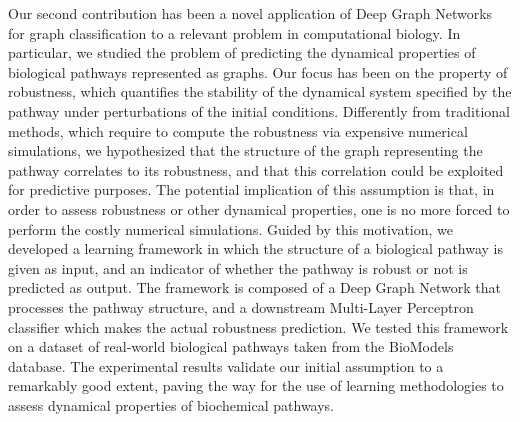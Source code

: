 Our second contribution has been a novel application of Deep Graph Networks for graph classification to a relevant problem in computational biology. In particular, we studied the problem of predicting the dynamical properties of biological pathways represented as graphs. Our focus has been on the property of robustness, which quantifies the stability of the dynamical system specified by the pathway under perturbations of the initial conditions. Differently from traditional methods, which require to compute the robustness via expensive numerical simulations, we hypothesized that the structure of the graph representing the pathway correlates to its robustness, and that this correlation could be exploited for predictive purposes. The potential implication of this assumption is that, in order to assess robustness or other dynamical properties, one is no more forced to perform the costly numerical simulations. Guided by this motivation, we developed a learning framework in which the structure of a biological pathway is given as input, and an indicator of whether the pathway is robust or not is predicted as output. The framework is composed of a Deep Graph Network that processes the pathway structure, and a downstream Multi-Layer Perceptron classifier which makes the actual robustness prediction. We tested this framework on a dataset of real-world biological pathways taken from the BioModels database. The experimental results validate our initial assumption to a remarkably good extent, paving the way for the use of learning methodologies to assess dynamical properties of biochemical pathways.

